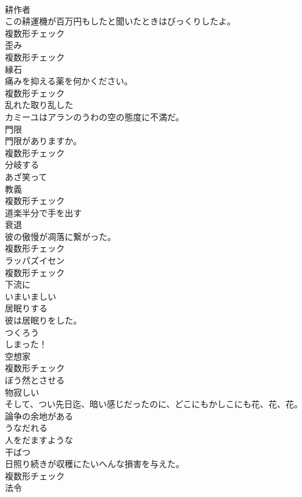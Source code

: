 \documentclass[8pt]{extreport}
\begin{document}
\begin{CJK}{UTF8}{min}
\\	[名詞]	耕作者	
\\	この耕運機が百万円もしたと聞いたときはびっくりしたよ。	
\\	複数形チェック
\\	[名詞]	歪み	
\\	複数形チェック
\\	[名詞]	縁石	
\\	痛みを抑える薬を何かください。	
\\	複数形チェック
\\	[形容詞]	乱れた取り乱した	
\\	カミーユはアランのうわの空の態度に不満だ。	
\\	[名詞]	門限	
\\	門限がありますか。	
\\	複数形チェック
\\	[動詞]	分岐する	
\\	[形容詞]	あざ笑って	
\\	[名詞]	教義	
\\	複数形チェック
\\	[動詞]	道楽半分で手を出す	
\\	[名詞]	衰退	
\\	彼の傲慢が凋落に繋がった。	
\\	複数形チェック
\\	[名詞]	ラッパズイセン	
\\	複数形チェック
\\	[形容詞]	下流に	
\\	[形容詞]	いまいましい	
\\	[動詞]	居眠りする	
\\	彼は居眠りをした。	
\\	[動詞]	つくろう	
\\	しまった！	
\\	[名詞]	空想家	
\\	複数形チェック
\\	[動詞]	ぼう然とさせる	
\\	[形容詞]	物寂しい	
\\	そして、つい先日迄、暗い感じだったのに、どこにもかしこにも花、花、花。	
\\	[形容詞]	論争の余地がある	
\\	[動詞]	うなだれる	
\\	[形容詞]	人をだますような	
\\	[名詞]	干ばつ	
\\	日照り続きが収穫にたいへんな損害を与えた。	
\\	複数形チェック
\\	[名詞]	法令	

\end{CJK}
\end{document}
